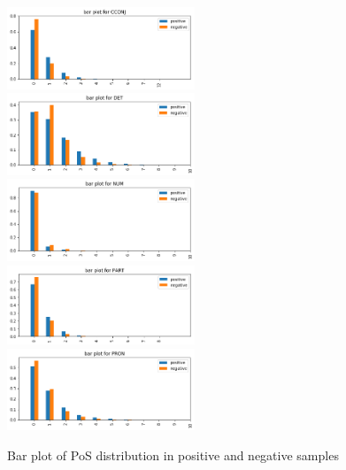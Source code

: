 \documentclass[12pt]{diazessay} %
\begin{document}
\begin{figure}[h!]
    \includegraphics[width=0.5\textwidth]{graphs/bar_pos/7.png}
    \includegraphics[width=0.5\textwidth]{graphs/bar_pos/8.png}
    \includegraphics[width=0.5\textwidth]{graphs/bar_pos/9.png}
    \includegraphics[width=0.5\textwidth]{graphs/bar_pos/10.png}
    \includegraphics[width=0.5\textwidth]{graphs/bar_pos/11.png}

    \caption{Bar plot of PoS distribution in positive and negative samples}
    
\end{figure}
\end{document}
